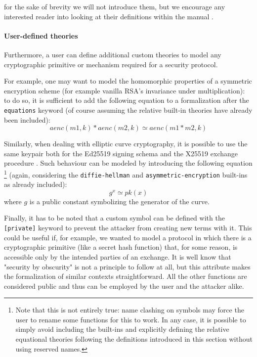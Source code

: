 \documentclass[fleqn,10pt]{SelfArx} %
\newcounter{definition}[section]\setcounter{definition}{0}
\begin{document}
for the sake of brevity we will not introduce them, but we encourage any interested reader into looking at their definitions within the manual \cite{tamarinManual}.

\paragraph{User-defined theories}
Furthermore, a user can define additional custom theories to model any cryptographic primitive or mechanism required for a security protocol.

For example, one may want to model the homomorphic properties of a symmetric encryption scheme (for example vanilla RSA's invariance under multiplication): to do so, it is sufficient to add the following equation to a formalization after the \lstinline|equations| keyword (of course assuming the relative built-in theories have already been included):
\begin{equation*}
    aenc(m1, k) * aenc(m2, k) \simeq aenc(m1*m2, k)
\end{equation*}

Similarly, when dealing with elliptic curve cryptography, it is possible to use the same keypair both for the Ed25519 signing schema and the X25519 exchange procedure \cite{signdh}. Such behaviour can be modeled by introducing the following equation \footnote{Note that this is not entirely true: name clashing on symbols may force the user to rename some functions for this to work. In any case, it is possible to simply avoid including the built-ins and explicitly defining the relative equational theories following the definitions introduced in this section without using reserved names.} (again, considering the \lstinline|diffie-hellman| and \lstinline|asymmetric-encryption| built-ins as already included):
\begin{equation*}
    g^x \simeq pk(x)
\end{equation*}
where $g$ is a public constant symbolizing the generator of the curve.

Finally, it has to be noted that a custom symbol can be defined with the \lstinline|[private]| keyword to prevent the attacker from creating new terms with it. This could be useful if, for example, we wanted to model a protocol in which there is a cryptographic primitive (like a secret hash function) that, for some reason, is accessible only by the intended parties of an exchange. It is well know that "security by obscurity" is not a principle to follow at all, but this attribute makes the formalization of similar contexts straightforward. All the other functions are considered public and thus can be employed by the user and the attacker alike.
\end{document}
